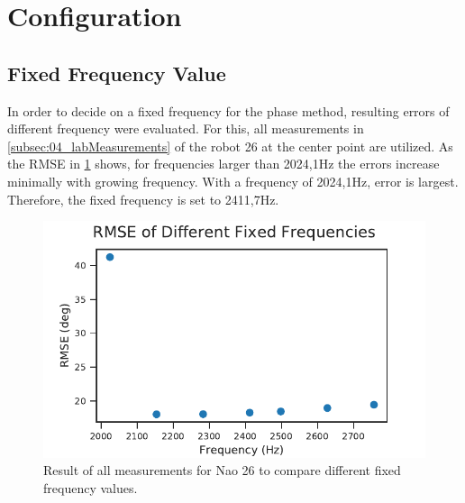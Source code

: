 \section{Configuration}
\label{04_configuration}

\subsection{Fixed Frequency Value}
\label{subsec:04_fixedFrequencyVal}

In order to decide on a fixed frequency for the phase method,
resulting errors of different frequency were evaluated.
For this, all measurements in \cref{subsec:04_labMeasurements}
of the robot 26 at the center point are utilized.
As the \ac{RMSE} in \cref{fig:04_diffFc} shows, for frequencies larger
than 2024,1\si{\hertz} the errors increase minimally with growing frequency.
With a frequency of 2024,1\si{\hertz}, error is largest.
Therefore, the fixed frequency is set to 2411,7\si{\hertz}.
\begin{figure}[ht]
	\centering
		\includegraphics[]{figures/evaluation/phase_fc_rmse}
	\caption{Result of all measurements for Nao 26 to compare different
	fixed frequency values.}
	\label{fig:04_diffFc}
\end{figure}
